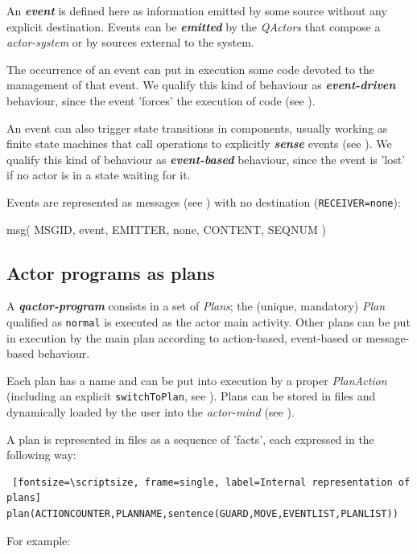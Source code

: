 An \textbf{\textit{event}} is defined here as information emitted by some source without any explicit destination. Events can be \textit{\textbf{emitted}} by the \textit{QActors} that compose a \textit{actor-system} or by sources external to the system.

The occurrence of an event can put in execution some code devoted to the management of that event. We qualify this kind of behaviour as \textit{\textbf{event-driven}} behaviour, since the event 'forces' the execution of code (see ).

An event can also trigger state transitions in components, usually working as finite state machines that call operations to explicitly \textit{\textbf{sense}} events (see ). We qualify this kind of behaviour as \textit{\textbf{event-based}} behaviour, since the event is 'lost' if no actor is in a state waiting for it.

Events are represented as messages (see ) with no destination (\texttt{RECEIVER=none}):

\begin{qacode}
msg( MSGID, event, EMITTER, none, CONTENT, SEQNUM )
\end{qacode}

 

\subsection{Actor programs as plans}
 
A \textit{\textbf{qactor-program}} consists in a set of \textit{Plans}; the (unique, mandatory) \textit{Plan} qualified as \texttt{normal} is executed as the actor main activity. Other plans can be put in execution by the main plan according to action-based, event-based or message-based behaviour.

Each plan has a name and can be put into execution by a proper \textit{PlanAction} (including an explicit \texttt{switchToPlan}, see ). Plans can be stored in files and dynamically loaded by the user into the \textit{actor-mind} (see \xss{}).

A plan is represented in files as a sequence of 'facts', each expressed in the following way:
\begin{Verbatim} [fontsize=\scriptsize, frame=single, label=Internal representation of plans]		
plan(ACTIONCOUNTER,PLANNAME,sentence(GUARD,MOVE,EVENTLIST,PLANLIST))
\end{Verbatim} 
For example:

